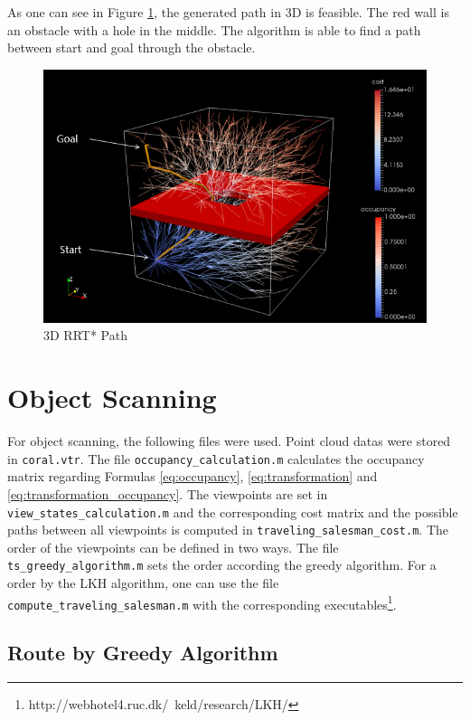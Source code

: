 As one can see in Figure \ref{pics:rrstar_3d}, the generated path in 3D is feasible. The red wall is an obstacle with a hole in the middle. The algorithm is able to find a path between start and goal through the obstacle.

\begin{figure} [h]
	\centering
	\includegraphics[width=1\textwidth]{images/rrtstar_3d.png}
	\caption{3D RRT* Path}
	\label{pics:rrstar_3d}
\end{figure}

\section{Object Scanning}
\label{sec:object_scanning}

For object scanning, the following files were used. Point cloud datas were stored in \verb+coral.vtr+. The file \verb|occupancy_calculation.m| calculates the occupancy matrix regarding Formulas \ref{eq:occupancy}, \ref{eq:transformation} and \ref{eq:transformation_occupancy}. The viewpoints are set in \verb|view_states_calculation.m| and the corresponding cost matrix and the possible paths between all viewpoints is computed in \verb|traveling_salesman_cost.m|. The order of the viewpoints can be defined in two ways. The file \verb|ts_greedy_algorithm.m| sets the order according the greedy algorithm. For a order by the LKH algorithm, one can use the file \verb|compute_traveling_salesman.m| with the corresponding executables\footnote{http://webhotel4.ruc.dk/~keld/research/LKH/}.  

\subsection{Route by Greedy Algorithm}

